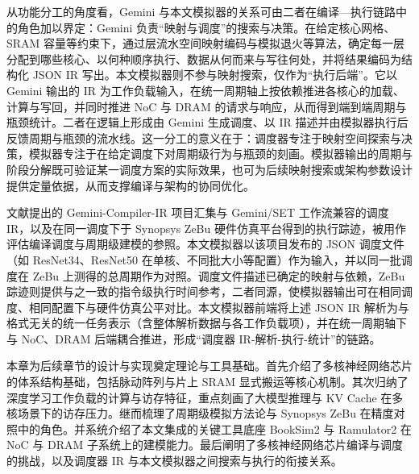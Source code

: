 从功能分工的角度看，Gemini 与本文模拟器的关系可由二者在编译—执行链路中的角色加以界定：Gemini 负责“映射与调度”的搜索与决策。在给定核心网格、SRAM 容量等约束下，通过层流水空间映射编码与模拟退火等算法，确定每一层分配到哪些核心、以何种顺序执行、数据从何而来与写往何处，并将结果编码为结构化 JSON IR 写出。本文模拟器则不参与映射搜索，仅作为“执行后端”。它以 Gemini 输出的 IR 为工作负载输入，在统一周期轴上按依赖推进各核心的加载、计算与写回，并同时推进 NoC 与 DRAM 的请求与响应，从而得到端到端周期与瓶颈统计。二者在逻辑上形成由 Gemini 生成调度、以 IR 描述并由模拟器执行后反馈周期与瓶颈的流水线。这一分工的意义在于：调度器专注于映射空间探索与决策，模拟器专注于在给定调度下对周期级行为与瓶颈的刻画。模拟器输出的周期与阶段分解既可验证某一调度方案的实际效果，也可为后续映射搜索或架构参数设计提供定量依据，从而支撑编译与架构的协同优化。

文献\parencite{cai2024gemini}提出的 Gemini-Compiler-IR 项目汇集与 Gemini/SET 工作流兼容的调度 IR，以及在同一调度下于 Synopsys ZeBu 硬件仿真平台得到的执行踪迹，被用作评估编译调度与周期级建模的参照。本文模拟器以该项目发布的 JSON 调度文件（如 ResNet34、ResNet50 在单核、不同批大小等配置）作为输入，并以同一批调度在 ZeBu 上测得的总周期作为对照。调度文件描述已确定的映射与依赖，ZeBu 踪迹则提供与之一致的指令级执行时间参考，二者同源，使模拟器输出可在相同调度、相同配置下与硬件仿真公平对比。本文模拟器前端将上述 JSON IR 解析为与格式无关的统一任务表示（含整体解析数据与各工作负载项），并在统一周期轴下与 NoC、DRAM 后端耦合推进，形成“调度器 IR-解析-执行-统计”的链路。


本章为后续章节的设计与实现奠定理论与工具基础。首先介绍了多核神经网络芯片的体系结构基础，包括脉动阵列与片上 SRAM 显式搬运等核心机制。其次归纳了深度学习工作负载的计算与访存特征，重点刻画了大模型推理与 KV Cache 在多核场景下的访存压力。继而梳理了周期级模拟方法论与 Synopsys ZeBu 在精度对照中的角色。并系统介绍了本文集成的关键工具底座 BookSim2 与 Ramulator2 在 NoC 与 DRAM 子系统上的建模能力。最后阐明了多核神经网络芯片编译与调度的挑战，以及调度器 IR 与本文模拟器之间搜索与执行的衔接关系。